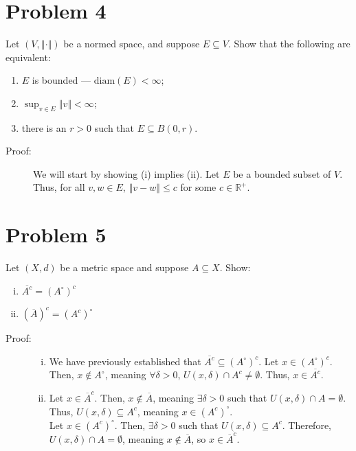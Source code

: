 \documentclass[8pt]{extarticle}
\newcommand{\R}{\mathbb{R}}
\newcommand{\norm}[1]{\left\Vert #1\right\Vert}
\begin{document}
  \section{Problem 4}%
  Let $(V,\norm{\cdot})$ be a normed space, and suppose $E\subseteq V$. Show that the following are equivalent:
  \begin{enumerate}[(1)]
    \item $E$ is bounded --- $\text{diam}(E) < \infty$;
    \item $\sup_{v\in E}\norm{v} < \infty$;
    \item there is an $r > 0$ such that $E\subseteq B(0,r)$.
  \end{enumerate}
  \begin{description}
    \item[Proof:] We will start by showing (i) implies (ii). Let $E$ be a bounded subset of $V$. Thus, for all $v,w\in E$, $\norm{v-w} \leq c$ for some $c\in \R^{+}$.
  \end{description}
  \section{Problem 5}%
  Let $(X,d)$ be a metric space and suppose $A\subseteq X$. Show:
  \begin{enumerate}[(i)]
    \item $\overline{A^c} = (A^{\circ})^{c}$
    \item $(\overline{A})^{c} = (A^{c})^{\circ}$
  \end{enumerate}
  \begin{description}
    \item[Proof:]\hfill
      \begin{enumerate}[(i)]
        \item We have previously established that $\overline{A^{c}}\subseteq (A^{\circ})^c$. Let $x\in (A^{\circ})^{c}$. Then, $x\notin A^{\circ}$, meaning $\forall \delta > 0$, $U(x,\delta)\cap A^{c} \neq \emptyset$. Thus, $x\in \overline{A^{c}}$.
        \item Let $x\in \overline{A}^{c}$. Then, $x\notin \overline{A}$, meaning $\exists \delta > 0$ such that $U(x,\delta) \cap A = \emptyset$. Thus, $U(x,\delta)\subseteq A^{c}$, meaning $x\in (A^{c})^{\circ}$.\\

          Let $x\in (A^{c})^{\circ}$. Then, $\exists \delta > 0$ such that $U(x,\delta)\subseteq A^{c}$. Therefore, $U(x,\delta)\cap A = \emptyset$, meaning $x\notin \overline{A}$, so $x\in \overline{A}^{c}$.
      \end{enumerate}
  \end{description}
\end{document}
